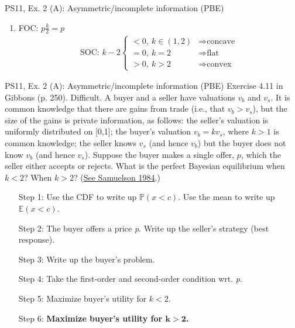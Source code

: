 \begin{frame}{PS11, Ex. 2 (A): Asymmetric/incomplete information (PBE)}
\begin{multicols}{2}
\begin{enumerate}
        \item FOC: $p\frac{k}{2}=p$\vspace{-6pt}
        \begin{align*}
          \text{SOC: }k-2\left\{\begin{array}{ll}
              <0,\ k\in(1,2)&\Rightarrow\text{concave}\\
              =0,\ k=2&\Rightarrow\text{flat}\\
              >0,\ k>2&\Rightarrow\text{convex}
          \end{array}\right.
        \end{align*}
      \end{enumerate}
      \vfill\null
    \end{multicols}
\end{frame}
\begin{frame}{PS11, Ex. 2 (A): Asymmetric/incomplete information (PBE)}
    Exercise 4.11 in Gibbons (p. 250). Difficult. A buyer and a seller have valuations $v_b$ and $v_s$. It is common knowledge that there are gains from trade (i.e., that $v_b > v_s$), but the size of the gains is private information, as follows: the seller’s valuation is uniformly distributed on [0,1]; the buyer’s valuation $v_b = kv_s$, where $k > 1$ is common knowledge; the seller knows $v_s$ (and hence $v_b$) but the buyer does not know $v_b$ (and hence $v_s$). Suppose the buyer makes a single offer, $p$, which the seller either accepts or rejects. What is the perfect Bayesian equilibrium when $k < 2$? When $k > 2$? (\href{https://www.jstor.org/stable/1911195}{See Samuelson 1984}.) \vspace{-8pt}
    \begin{multicols}{2}
      \begin{itemize}
        \item[Step 1:] Use the CDF to write up $\mathbb{P}(x<c)$. Use the mean to write up $\mathbb{E}(x<c)$.
        \item[Step 2:] The buyer offers a price \textit{p}. Write up the seller's strategy (best response).
        \item[Step 3:] Write up the buyer's problem.
        \item[Step 4:] Take the first-order and second-order condition wrt. \textit{p}.
        \item[Step 5:] Maximize buyer's utility for $k<2$.
        \item[Step 6:] \textbf{Maximize buyer's utility for $\bm{k>2}$.}
      \end{itemize}

\end{multicols}
\end{frame}
